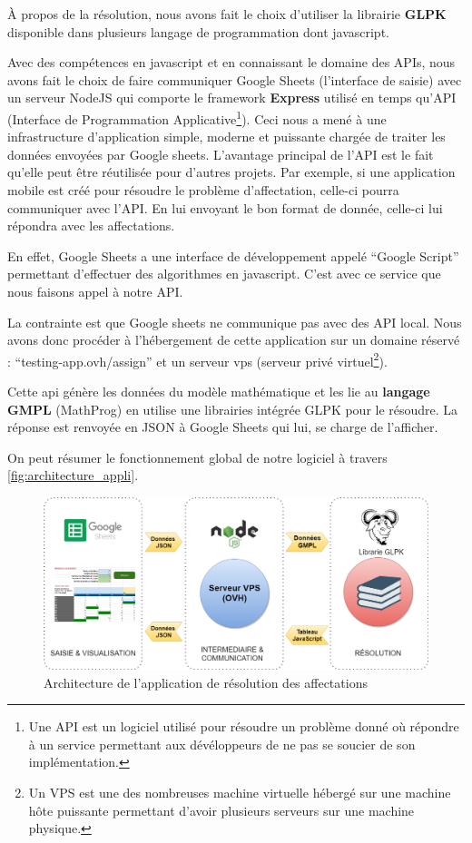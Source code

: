 \documentclass[final,poster]{polytech/polytech}
\begin{document}
À propos de la résolution, nous avons fait le choix d’utiliser la librairie \textbf{GLPK} disponible dans plusieurs langage de programmation dont javascript. 

Avec des compétences en javascript et en connaissant le domaine des APIs, nous avons fait le choix de faire communiquer Google Sheets (l’interface de saisie) avec un serveur NodeJS qui comporte le framework \textbf{Express} utilisé en temps qu’API (Interface de Programmation Applicative\footnote{Une API est un logiciel utilisé pour résoudre un problème donné où répondre à un service permettant aux dévéloppeurs de ne pas se soucier de son implémentation.}).
 Ceci nous a mené à une  infrastructure d’application simple, moderne et puissante chargée de traiter les données envoyées par Google sheets.
L’avantage principal de l’API est le fait qu’elle peut être réutilisée pour d’autres projets. 
Par exemple, si une application mobile est créé pour résoudre le problème d’affectation, celle-ci pourra communiquer avec l’API.
En lui envoyant le bon format de donnée, celle-ci lui répondra avec les affectations. 

En effet, Google Sheets a une interface de développement appelé “Google Script” permettant d’effectuer des algorithmes en javascript.
C'est avec ce service que nous faisons appel à notre API.

La contrainte est que Google sheets ne communique pas avec des API local. Nous avons donc procéder à l'hébergement de cette application sur un domaine réservé : “testing-app.ovh/assign” et un serveur vps (serveur privé virtuel\footnote{Un VPS est une des nombreuses machine virtuelle hébergé sur une machine hôte puissante permettant d'avoir plusieurs serveurs sur une machine physique.}).

Cette api génère les données du modèle mathématique et les lie au \textbf{langage GMPL} (MathProg) en utilise une librairies intégrée GLPK pour le résoudre. 
La réponse est renvoyée en JSON à Google Sheets qui lui, se charge de l’afficher.

On peut résumer le fonctionnement global de notre logiciel à travers \autoref{fig:architecture_appli}.

\begin{figure}[htbp]
\includegraphics[width=15cm]{images/architecture_appli}
\caption{\label{fig:architecture_appli} Architecture de l'application de résolution des affectations}
\end{figure}
\end{document}
